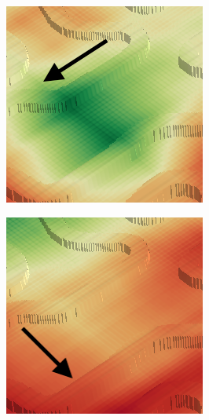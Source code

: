 \documentclass[../document.tex]{subfiles}
\begin{document}
\begin{figure}[H]
\begin{subfigure}[b]{0.23\textwidth}
      \includegraphics[width=\linewidth]{../img/4/traversability/bars/tunnel/-90-crop.png}
  \end{subfigure}
  \begin{subfigure}[b]{0.23\textwidth}
    \includegraphics[width=\linewidth]{../img/4/traversability/bars/tunnel/-0-crop.png}

\end{subfigure}
\end{figure}
\end{document}
